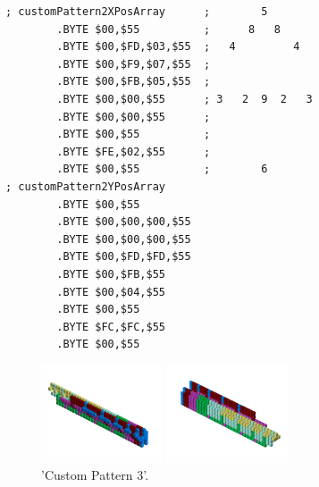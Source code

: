 \begin{minipage}[b]{0.48\linewidth}
\begin{lrbox}{\mybox}%
\begin{lstlisting}[basicstyle=\ttfamily\tiny]
; customPattern2XPosArray      ;        5       
        .BYTE $00,$55          ;      8   8     
        .BYTE $00,$FD,$03,$55  ;   4         4  
        .BYTE $00,$F9,$07,$55  ;                
        .BYTE $00,$FB,$05,$55  ;                
        .BYTE $00,$00,$55      ; 3   2  9  2   3
        .BYTE $00,$00,$55      ;                
        .BYTE $00,$55          ;                
        .BYTE $FE,$02,$55      ;                
        .BYTE $00,$55          ;        6       
; customPattern2YPosArray
        .BYTE $00,$55
        .BYTE $00,$00,$00,$55
        .BYTE $00,$00,$00,$55
        .BYTE $00,$FD,$FD,$55
        .BYTE $00,$FB,$55
        .BYTE $00,$04,$55
        .BYTE $00,$55
        .BYTE $FC,$FC,$55
        .BYTE $00,$55
\end{lstlisting}
\end{lrbox}%
\scalebox{0.8}{\usebox{\mybox}}

\end{minipage}
\begin{minipage}[b]{0.50\linewidth}
\begin{figure}[H]
    \centering
    \begin{adjustbox}{width=6cm,margin=0cm 0cm}
      \includegraphics[width=3.6cm]{src/patterns/pattern11-45.png}%
    \end{adjustbox}
    \begin{adjustbox}{width=6cm,margin=0cm -1.8cm}
      \includegraphics[width=3.6cm]{src/patterns/pattern11-225.png}%
    \end{adjustbox}
\caption{'Custom Pattern 3'.}
\end{figure}
\end{minipage}
